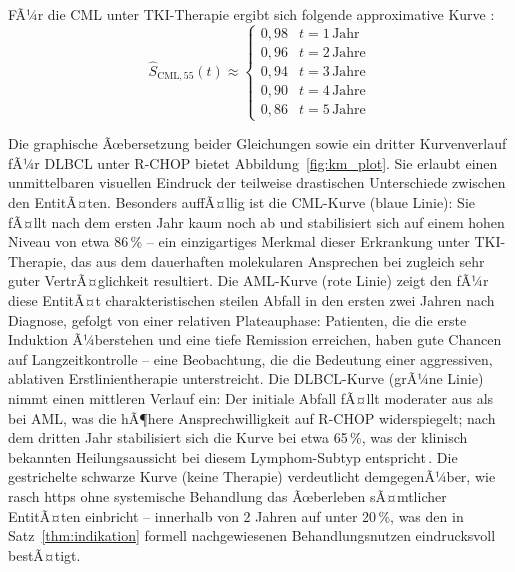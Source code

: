 ﻿\documentclass[12pt,a4paper]{article}
\theoremstyle{definition}
\begin{document}
FÃ¼r die CML unter TKI-Therapie ergibt sich folgende approximative Kurve
\cite{hochhaus2017}:
\begin{equation}
  \hat{S}_{\mathrm{CML},55}(t) \approx
  \begin{cases}
    0{,}98 & t = 1\,\text{Jahr} \\
    0{,}96 & t = 2\,\text{Jahre} \\
    0{,}94 & t = 3\,\text{Jahre} \\
    0{,}90 & t = 4\,\text{Jahre} \\
    0{,}86 & t = 5\,\text{Jahre}
  \end{cases}
  \label{eq:km_cml}
\end{equation}

Die graphische Ãœbersetzung beider Gleichungen sowie ein dritter Kurvenverlauf
fÃ¼r DLBCL unter R-CHOP bietet Abbildung~\ref{fig:km_plot}. Sie erlaubt einen
unmittelbaren visuellen Eindruck der teilweise drastischen Unterschiede zwischen
den EntitÃ¤ten. Besonders auffÃ¤llig ist die CML-Kurve (blaue Linie): Sie fÃ¤llt
nach dem ersten Jahr kaum noch ab und stabilisiert sich auf einem hohen Niveau
von etwa 86\,\% -- ein einzigartiges Merkmal dieser Erkrankung unter TKI-Therapie,
das aus dem dauerhaften molekularen Ansprechen bei zugleich sehr guter
VertrÃ¤glichkeit resultiert. Die AML-Kurve (rote Linie) zeigt den fÃ¼r diese
EntitÃ¤t charakteristischen steilen Abfall in den ersten zwei Jahren nach Diagnose,
gefolgt von einer relativen Plateauphase: Patienten, die die erste Induktion
Ã¼berstehen und eine tiefe Remission erreichen, haben gute Chancen auf
Langzeitkontrolle -- eine Beobachtung, die die Bedeutung einer aggressiven,
ablativen Erstlinientherapie unterstreicht. Die DLBCL-Kurve (grÃ¼ne Linie) nimmt
einen mittleren Verlauf ein: Der initiale Abfall fÃ¤llt moderater aus als bei AML,
was die hÃ¶here Ansprechwilligkeit auf R-CHOP widerspiegelt; nach dem dritten
Jahr stabilisiert sich die Kurve bei etwa 65\,\%, was der klinisch bekannten
Heilungsaussicht bei diesem Lymphom-Subtyp entspricht\,\cite{coiffier2002}. Die
gestrichelte schwarze Kurve (keine Therapie) verdeutlicht demgegenÃ¼ber, wie rasch
https ohne systemische Behandlung das Ãœberleben sÃ¤mtlicher EntitÃ¤ten einbricht
-- innerhalb von 2 Jahren auf unter 20\,\%, was den in Satz~\ref{thm:indikation}
formell nachgewiesenen Behandlungsnutzen eindrucksvoll bestÃ¤tigt.
\end{document}

